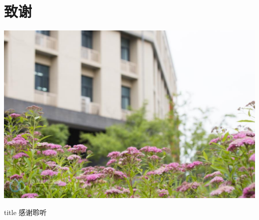 \documentclass[10pt]{ctexbeamer}
\begin{document}
\section*{致谢}  
{
  \centering
  \includegraphics[trim=0 100 0 0,height=\paperheight,angle=0]{pic/njupt.flower.pdf}
}
\begin{frame}
\vfill
\centering
\begin{beamercolorbox}[sep=8pt,center,shadow=true,rounded=true]{title}
  \Huge{感谢聆听}
\end{beamercolorbox}
\vfill
\end{frame}
\end{document}
